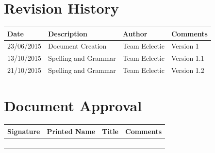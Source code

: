\documentclass[11pt]{article}
\begin{document}


\setcounter{tocdepth}{3}
\setcounter{secnumdepth}{5}
\tableofcontents

\newpage
\section{Revision History}
\begin{table}[h]
\begin{tabular}{llll}
\textbf{Date}          & \textbf{Description}  & \textbf{Author}       & \textbf{Comments}   \\ \hline
\multicolumn{1}{|R{2cm}|}{23/06/2015} & \multicolumn{1}{L{4.5cm}|}{Document Creation} & \multicolumn{1}{l|}{Team Eclectic} & \multicolumn{1}{L{4cm}|}{Version 1} \\ \hline
\multicolumn{1}{|R{2cm}|}{13/10/2015} & \multicolumn{1}{L{4.5cm}|}{Spelling and Grammar} & \multicolumn{1}{l|}{Team Eclectic} & \multicolumn{1}{L{4cm}|}{Version 1.1} \\ \hline
\multicolumn{1}{|R{2cm}|}{21/10/2015} & \multicolumn{1}{L{4.5cm}|}{Spelling and Grammar} & \multicolumn{1}{l|}{Team Eclectic} & \multicolumn{1}{L{4cm}|}{Version 1.2} \\ \hline

\end{tabular}
\end{table}

\section{Document Approval}
\begin{table}[h]
\begin{tabular}{llll}
\textbf{Signature}     & \textbf{Printed Name} & \textbf{Title}        & \textbf{Comments}     \\ \hline
\multicolumn{1}{|l|}{} & \multicolumn{1}{L{3.5cm}|}{} & \multicolumn{1}{L{3.5cm}|}{} & \multicolumn{1}{L{4cm}|}{} \\ \hline
\multicolumn{1}{|l|}{} & \multicolumn{1}{l|}{} & \multicolumn{1}{l|}{} & \multicolumn{1}{l|}{} \\ \hline
\multicolumn{1}{|l|}{} & \multicolumn{1}{l|}{} & \multicolumn{1}{l|}{} & \multicolumn{1}{l|}{} \\ \hline
\multicolumn{1}{|l|}{} & \multicolumn{1}{l|}{} & \multicolumn{1}{l|}{} & \multicolumn{1}{l|}{} \\ \hline
\end{tabular}
\end{table}
\end{document}
